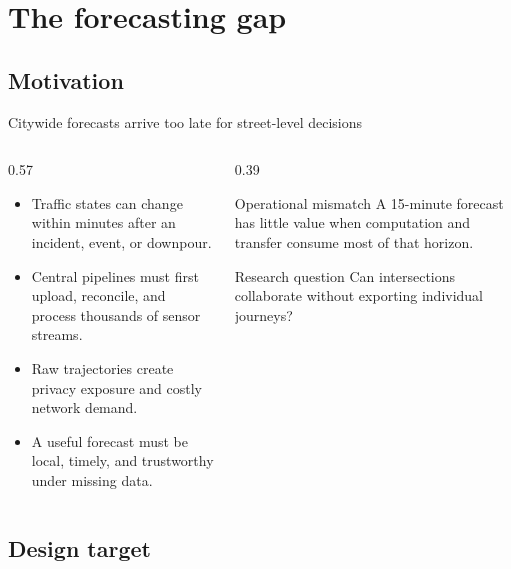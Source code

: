 \section{The forecasting gap}
\subsection{Motivation}

\begin{frame}{Citywide forecasts arrive too late for street-level decisions}
  \begin{columns}[T,onlytextwidth]
    \begin{column}{0.57\textwidth}
      \begin{itemize}[<+->]
        \item Traffic states can change within minutes after an incident, event, or downpour.
        \item Central pipelines must first upload, reconcile, and process thousands of sensor streams.
        \item Raw trajectories create privacy exposure and costly network demand.
        \item A useful forecast must be \alert{local, timely, and trustworthy under missing data}.
      \end{itemize}
    \end{column}
    \begin{column}{0.39\textwidth}
      \begin{alertblock}{Operational mismatch}
        A 15-minute forecast has little value when computation and transfer consume most of that horizon.
      \end{alertblock}
      \vspace{0.25cm}
      \begin{exampleblock}{Research question}
        Can intersections collaborate without exporting individual journeys?
      \end{exampleblock}
    \end{column}
  \end{columns}
\end{frame}

\subsection{Design target}

